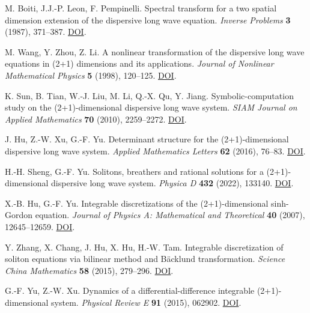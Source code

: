 \documentclass{article}
\theoremstyle{plain}
\theoremstyle{definition}
\begin{document}
\begin{enumerate}[label={[\arabic*]},leftmargin=*,itemsep=1.5pt]
 
\item M. Boiti, J.J.-P. Leon, F. Pempinelli. Spectral transform for a two spatial dimension extension of the dispersive long wave equation. \emph{Inverse Problems} \textbf{3} (1987), 371–387. \href{https://doi.org/10.1088/0266-5611/3/3/007}{DOI}.
 
\item M. Wang, Y. Zhou, Z. Li. A nonlinear transformation of the dispersive long wave equations in (2+1) dimensions and its applications. \emph{Journal of Nonlinear Mathematical Physics} \textbf{5} (1998), 120–125. \href{https://doi.org/10.2991/jnmp.1998.5.2.2}{DOI}.
 
\item K. Sun, B. Tian, W.-J. Liu, M. Li, Q.-X. Qu, Y. Jiang. Symbolic-computation study on the (2+1)-dimensional dispersive long wave system. \emph{SIAM Journal on Applied Mathematics} \textbf{70} (2010), 2259–2272. \href{https://doi.org/10.1137/090774847}{DOI}.
 
\item J. Hu, Z.-W. Xu, G.-F. Yu. Determinant structure for the (2+1)-dimensional dispersive long wave system. \emph{Applied Mathematics Letters} \textbf{62} (2016), 76–83. \href{https://doi.org/10.1016/j.aml.2016.07.003}{DOI}.
 
\item H.-H. Sheng, G.-F. Yu. Solitons, breathers and rational solutions for a (2+1)-dimensional dispersive long wave system. \emph{Physica D} \textbf{432} (2022), 133140. \href{https://doi.org/10.1016/j.physd.2021.133140}{DOI}.
 
\item X.-B. Hu, G.-F. Yu. Integrable discretizations of the (2+1)-dimensional sinh-Gordon equation. \emph{Journal of Physics A: Mathematical and Theoretical} \textbf{40} (2007), 12645–12659. \href{https://doi.org/10.1088/1751-8113/40/42/S10}{DOI}.
 
\item Y. Zhang, X. Chang, J. Hu, X. Hu, H.-W. Tam. Integrable discretization of soliton equations via bilinear method and Bäcklund transformation. \emph{Science China Mathematics} \textbf{58} (2015), 279–296. \href{https://doi.org/10.1007/s11425-014-4952-6}{DOI}.
 
\item G.-F. Yu, Z.-W. Xu. Dynamics of a differential-difference integrable (2+1)-dimensional system. \emph{Physical Review E} \textbf{91} (2015), 062902. \href{https://doi.org/10.1103/PhysRevE.91.062902}{DOI}.
 

\end{enumerate}
\end{document}
